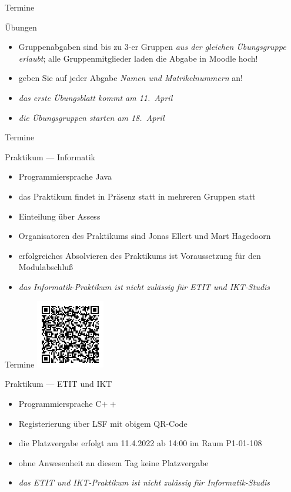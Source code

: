 \documentclass[aspectratio=1610, 11pt]{beamer}
\begin{document}
\begin{frame}{Termine}
	\begin{exampleblock}{\"Ubungen}
		\begin{itemize}
			\item Gruppenabgaben sind bis zu 3-er Gruppen \emph{aus der gleichen \"Ubungsgruppe erlaubt}; alle Gruppenmitglieder laden die Abgabe in Moodle hoch!
			\item geben Sie auf jeder Abgabe \emph{Namen und Matrikelnummern} an!
			\item \emph{das erste \"Ubungsblatt kommt am 11.~April}
			\item \emph{die \"Ubungsgruppen starten am 18.~April}
		\end{itemize}
	\end{exampleblock}
\end{frame}

\begin{frame}{Termine}
	\begin{exampleblock}{Praktikum --- Informatik}
		\begin{itemize}
			\item Programmiersprache Java
			\item das Praktikum findet in Pr\"asenz statt in mehreren Gruppen statt
			\item Einteilung \"uber Assess
			\item Organisatoren des Praktikums sind Jonas Ellert und Mart Hagedoorn
			\item erfolgreiches Absolvieren des Praktikums ist Voraussetzung f\"ur den Modulabschlu\ss
			\item \emph{das Informatik-Praktikum ist nicht zul\"assig f\"ur ETIT und IKT-Studis}
		\end{itemize}
	\end{exampleblock}
\end{frame}

\begin{frame}{Termine}
		\hfill\includegraphics[height=30mm]{./images/DAP2_CPP_LSF.png}
	\begin{exampleblock}{Praktikum --- ETIT und IKT}
		\begin{itemize}
			\item Programmiersprache C$++$
			\item Registerierung \"uber LSF mit obigem QR-Code
			\item die Platzvergabe erfolgt am 11.4.2022 ab 14:00 im Raum P1-01-108
			\item ohne Anwesenheit an diesem Tag keine Platzvergabe
			\item \emph{das ETIT und IKT-Praktikum ist nicht zul\"assig f\"ur Informatik-Studis}
		\end{itemize}
	\end{exampleblock}
\end{frame}
\end{document}
